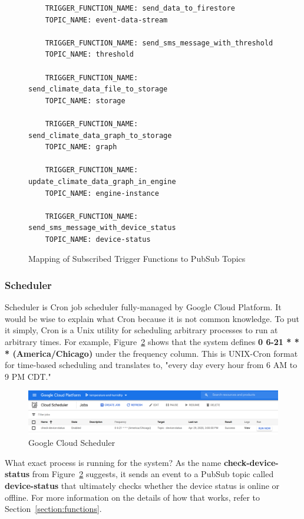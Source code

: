 \documentclass{article}
\begin{document}
\begin{figure}[H]
	\begin{lstlisting}
    TRIGGER_FUNCTION_NAME: send_data_to_firestore
    TOPIC_NAME: event-data-stream

    TRIGGER_FUNCTION_NAME: send_sms_message_with_threshold
    TOPIC_NAME: threshold

    TRIGGER_FUNCTION_NAME: send_climate_data_file_to_storage
    TOPIC_NAME: storage

    TRIGGER_FUNCTION_NAME: send_climate_data_graph_to_storage
    TOPIC_NAME: graph

    TRIGGER_FUNCTION_NAME: update_climate_data_graph_in_engine
    TOPIC_NAME: engine-instance

    TRIGGER_FUNCTION_NAME: send_sms_message_with_device_status
    TOPIC_NAME: device-status
    \end{lstlisting}
	\caption{Mapping of Subscribed Trigger Functions to PubSub Topics}
	\label{fig:mapping}
\end{figure}

\subsubsection{Scheduler}
\label{section:scheduler}
Scheduler is Cron job scheduler fully-managed by Google Cloud Platform. It would be wise to explain what Cron because it is not common knowledge. To put it simply, Cron is a Unix utility for scheduling arbitrary processes to run at arbitrary times. For example, Figure~\ref{fig:scheduler} shows that the system defines \textbf{0 6-21 * * * (America/Chicago)} under the frequency column. This is UNIX-Cron format for time-based scheduling and translates to, "every day every hour from 6 AM to 9 PM CDT."

\begin{figure}[H]
	\center
	\includegraphics[width=\textwidth]{images/scheduler.png}
	\caption{Google Cloud Scheduler}
	\label{fig:scheduler}
\end{figure}

What exact process is running for the system? As the name \textbf{check-device-status} from Figure~\ref{fig:scheduler} suggests, it sends an event to a PubSub topic called \textbf{device-status} that ultimately checks whether the device status is online or offline. For more information on the details of how that works, refer to Section~\ref{section:functions}.
\end{document}

